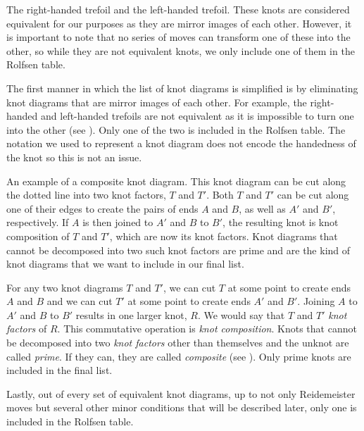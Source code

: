 \begin{paper}
{The right-handed trefoil and the left-handed trefoil.
These knots are considered equivalent for our purposes as they are mirror images
of each other.
However, it is important to note that no series of moves can transform one of
these into the other, so while they are not equivalent knots, we only include
one of them in the Rolfsen table.}

The first manner in which the list of knot diagrams is simplified is by
eliminating knot diagrams that are mirror images of each other.
For example, the right-handed and left-handed trefoils are not equivalent as it
is impossible to turn one into the other (see \figTrefoil).
Only one of the two is included in the Rolfsen table.
The notation we used to represent a knot diagram does not encode the handedness
of the knot so this is not an issue.

{An example of a composite knot diagram.
This knot diagram can be cut along the dotted line into two knot factors, $T$
and $T'$.
Both $T$ and $T'$ can be cut along one of their edges to create the pairs of
ends $A$ and $B$, as well as $A'$ and $B'$, respectively.
If $A$ is then joined to $A'$ and $B$ to $B'$, the resulting knot is knot
composition of $T$ and $T'$, which are now its knot factors.
Knot diagrams that cannot be decomposed into two such knot factors are prime and
are the kind of knot diagrams that we want to include in our final list.}

For any two knot diagrams $T$ and $T'$, we can cut $T$ at some point to create
ends $A$ and $B$ and we can cut $T'$ at some point to create ends $A'$ and $B'$.
Joining $A$ to $A'$ and $B$ to $B'$ results in one larger knot, $R$.
We would say that $T$ and $T'$ \textit{knot factors} of $R$.
This commutative operation is \textit{knot composition}.
Knots that cannot be decomposed into two \textit{knot factors} other than
themselves and the unknot are called \textit{prime}.
If they can, they are called \textit{composite} (see \figComposite).
Only prime knots are included in the final list.

Lastly, out of every set of equivalent knot diagrams, up to not only
Reidemeister moves but several other minor conditions that will be described
later, only one is included in the Rolfsen table.


\end{paper}
